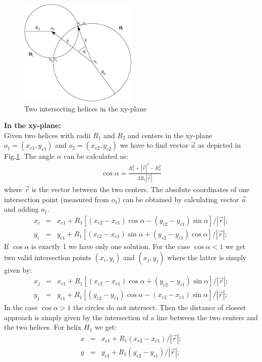 \documentclass[twoside]{article}
\begin{document}
\begin{figure}[hbt]  
    \begin{center}
        \includegraphics[width=0.5\textwidth]{twoHelices.eps}
        \caption{Two intersecting helices in the xy-plane}
    \end{center}
    \label{fig:dcahelices}
\end{figure}
{\bf In the xy-plane:}\\
Given two helices with radii $R_1$ and $R_2$ and centers in the
xy-plane $o_1 = (x_{c1}, y_{c1})$ and $o_2 = (x_{c2}, y_{c2})$ we have
to find vector $\vec{a}$ as depicted in Fig.\ref{fig:dcahelices}.  The
angle $\alpha$ can be calculated as:
\begin{eqnarray}
    \cos \alpha = \frac{R^2_1 + |\vec{r}|^2 - R^2_2}{2 R_1 |\vec{r}|}
\end{eqnarray}
where $\vec{r}$ is the vector between the two centers. The absolute
coordinates of one intersection point (measured from $o_1$) can be
obtained by calculating vector $\vec{a}$ and adding $o_1$.
\begin{eqnarray}
    x_i &=& x_{c1} + R_1 [ (x_{c2}-x_{c1}) \cos \alpha -  (y_{c2}-y_{c1}) \sin \alpha]/|\vec{r}|;\\
    y_i &=& y_{c1} + R_1 [ (x_{c2}-x_{c1}) \sin \alpha +  (y_{c2}-y_{c1}) \cos \alpha]/|\vec{r}|;
\end{eqnarray}
If $\cos \alpha$ is exactly 1 we have only one solution. For the case
$\cos \alpha < 1$ we get two valid intersection points $(x_i, y_i)$
and $(x_j, y_j)$ where the latter is simply given by:
\begin{eqnarray}
    x_j &=& x_{c1} + R_1 [ (x_{c2}-x_{c1}) \cos \alpha +  (y_{c2}-y_{c1}) \sin \alpha]/|\vec{r}|;\\
    y_j &=& y_{c1} + R_1 [ (y_{c2}-y_{c1}) \cos \alpha -  (x_{c2}-x_{c1}) \sin \alpha]/|\vec{r}|;
\end{eqnarray}
In the case $\cos \alpha > 1$ the circles do not intersect. Then the
distance of closest approach is simply given by the intersection of a
line between the two centers and the two helices. For helix $H_1$ we
get:
\begin{eqnarray}
    x &=& x_{c1} + R_1 (x_{c2}-x_{c1})/|\vec{r}|;\\
    y &=& y_{c1} + R_1 (y_{c2}-y_{c1})/|\vec{r}|;
\end{eqnarray}
\end{document}
